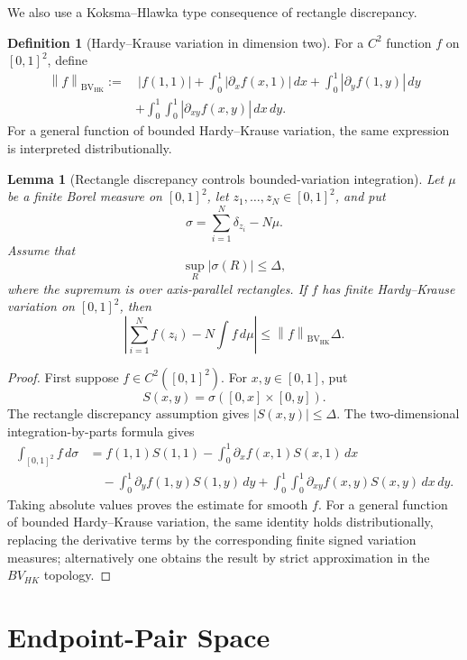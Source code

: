 \documentclass[11pt]{article}
\newtheorem{lemma}[theorem]{Lemma}
\theoremstyle{definition}
\newtheorem{definition}[theorem]{Definition}
\newcommand{\BVHK}{\operatorname{BV}_{\mathrm{HK}}}
\newcommand{\norm}[1]{\left\|#1\right\|}
\begin{document}
\smallskip
\noindent
We also use a Koksma--Hlawka type consequence of rectangle discrepancy.

\begin{definition}[Hardy--Krause variation in dimension two]
For a $C^2$ function $f$ on $[0,1]^2$, define
\[
\begin{aligned}
        \norm{f}_{\BVHK}
        :=&\ |f(1,1)|
        +\int_0^1 |\partial_x f(x,1)|\,dx
        +\int_0^1 |\partial_y f(1,y)|\,dy \\
        &+\int_0^1\int_0^1 |\partial_{xy} f(x,y)|\,dx\,dy.
\end{aligned}
\]
For a general function of bounded Hardy--Krause variation, the same expression is interpreted distributionally.
\end{definition}

\begin{lemma}[Rectangle discrepancy controls bounded-variation integration]\label{lem:KH}
Let $\mu$ be a finite Borel measure on $[0,1]^2$, let $z_1,\dots,z_N\in[0,1]^2$, and put
\[
        \sigma=\sum_{i=1}^N\delta_{z_i}-N\mu.
\]
Assume that
\[
        \sup_R |\sigma(R)|\le \Delta,
\]
where the supremum is over axis-parallel rectangles.  If $f$ has finite Hardy--Krause variation on $[0,1]^2$, then
\[
        \left|\sum_{i=1}^N f(z_i)-N\int f\,d\mu\right|
        \le \norm{f}_{\BVHK}\Delta.
\]
\end{lemma}

\begin{proof}
First suppose $f\in C^2([0,1]^2)$.  For $x,y\in[0,1]$, put
\[
        S(x,y)=\sigma([0,x]\times[0,y]).
\]
The rectangle discrepancy assumption gives $|S(x,y)|\le \Delta$.  The two-dimensional integration-by-parts formula gives
\[
\begin{aligned}
        \int_{[0,1]^2} f\,d\sigma
        &= f(1,1)S(1,1)
        -\int_0^1 \partial_x f(x,1)S(x,1)\,dx \\
        &\quad -\int_0^1 \partial_y f(1,y)S(1,y)\,dy
        +\int_0^1\int_0^1 \partial_{xy}f(x,y)S(x,y)\,dx\,dy.
\end{aligned}
\]
Taking absolute values proves the estimate for smooth $f$.  For a general function of bounded Hardy--Krause variation, the same identity holds distributionally, replacing the derivative terms by the corresponding finite signed variation measures; alternatively one obtains the result by strict approximation in the $BV_{HK}$ topology.
\end{proof}

\section{Endpoint-Pair Space}
\end{document}
